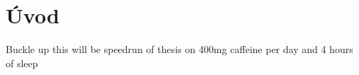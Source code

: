 \chapter{Úvod}
\label{sec:Introduction}
Buckle up this will be speedrun of thesis on 400mg caffeine per day and 4 hours of sleep
\endinput